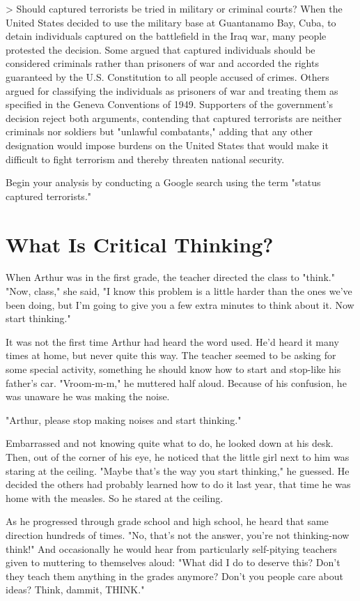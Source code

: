 \documentclass{book}
\begin{document}
> Should captured terrorists be tried in military or criminal courts? When the United States decided to use the military base at Guantanamo Bay, Cuba, to detain individuals captured on the battlefield in the Iraq war, many people protested the decision. Some argued that captured individuals should be considered criminals rather than prisoners of war and accorded the rights guaranteed by the U.S. Constitution to all people accused of crimes. Others argued for classifying the individuals as prisoners of war and treating them as specified in the Geneva Conventions of 1949. Supporters of the government’s decision reject both arguments, contending that captured terrorists are neither criminals nor soldiers but "unlawful combatants," adding that any other designation would impose burdens on the United States that would make it difficult to fight terrorism and thereby threaten national security.

Begin your analysis by conducting a Google search using the term "status captured terrorists."

\chapter{What Is Critical Thinking?}

When Arthur was in the first grade, the teacher directed the class to "think." "Now, class," she said, "I know this problem is a little harder than the ones we’ve been doing, but I’m going to give you a few extra minutes to think about it. Now start thinking."

It was not the first time Arthur had heard the word used. He’d heard it many times at home, but never quite this way. The teacher seemed to be asking for some special activity, something he should know how to start and stop-like his father’s car. "Vroom-m-m," he muttered half aloud. Because of his confusion, he was unaware he was making the noise.

"Arthur, please stop making noises and start thinking."

Embarrassed and not knowing quite what to do, he looked down at his desk. Then, out of the corner of his eye, he noticed that the little girl next to him was staring at the ceiling. "Maybe that’s the way you start thinking," he guessed. He decided the others had probably learned how to do it last year, that time he was home with the measles. So he stared at the ceiling.

As he progressed through grade school and high school, he heard that same direction hundreds of times. "No, that’s not the answer, you’re not thinking-now think!" And occasionally he would hear from particularly self-pitying teachers given to muttering to themselves aloud: "What did I do to deserve this? Don’t they teach them anything in the grades anymore? Don’t you people care about ideas? Think, dammit, THINK."
\end{document}
